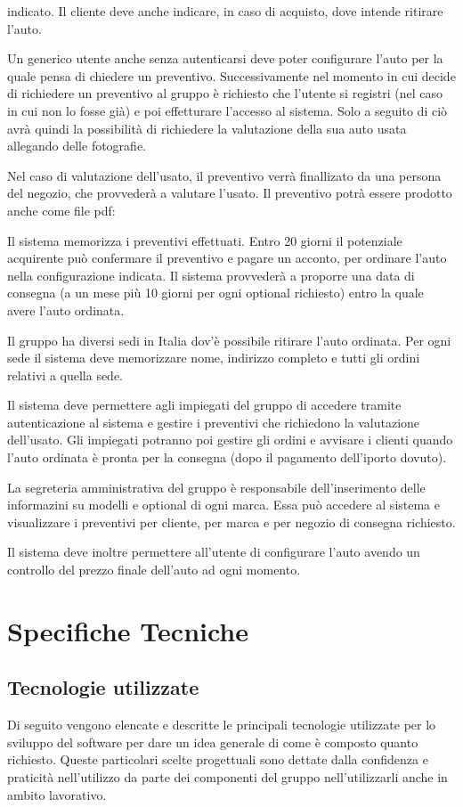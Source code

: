 \documentclass[a4paper, 11pt,oneside,]{book}
\newcommand{\spacing}{\par\bigskip\noindent}
\begin{document}
    indicato. Il cliente deve anche indicare, in caso di acquisto, dove intende ritirare l'auto.
    \spacing
    Un generico utente anche senza autenticarsi deve poter configurare l'auto per la quale pensa di chiedere un preventivo. Successivamente nel momento in cui decide di richiedere
    un preventivo al gruppo è richiesto che l'utente si registri (nel caso in cui non lo fosse già) e poi effetturare l'accesso al sistema. Solo a seguito di ciò avrà quindi la
    possibilità di richiedere la valutazione della sua auto usata allegando delle fotografie.
    \spacing
    Nel caso di valutazione dell'usato, il preventivo verrà finallizato da una persona del negozio, che provvederà a valutare l'usato. Il preventivo potrà essere prodotto anche come file pdf:
    \spacing
    Il sistema memorizza i preventivi effettuati. Entro 20 giorni il potenziale acquirente può confermare il preventivo e pagare un acconto, per ordinare l'auto nella configurazione
    indicata. Il sistema provvederà a proporre una data di consegna (a un mese più 10 giorni per ogni optional richiesto) entro la quale avere l'auto ordinata.
    \spacing
    Il gruppo ha diversi sedi in Italia dov'è possibile ritirare l'auto ordinata. Per ogni sede il sistema deve memorizzare nome, indirizzo completo e tutti gli ordini relativi a quella sede.
    \spacing
    Il sistema deve permettere agli impiegati del gruppo di accedere tramite autenticazione al sistema e gestire i preventivi che richiedono la valutazione dell'usato. Gli impiegati potranno poi 
    gestire gli ordini e avvisare i clienti quando l'auto ordinata è pronta per la consegna (dopo il pagamento dell'iporto dovuto).
    \spacing
    La segreteria amministrativa del gruppo è responsabile dell'inserimento delle informazini su modelli e optional di ogni marca. Essa può accedere al sistema e visualizzare i preventivi per cliente, per marca
    e per negozio di consegna richiesto.
    \spacing
    Il sistema deve inoltre permettere all'utente di configurare l'auto avendo un controllo del prezzo finale dell'auto ad ogni momento.



\chapter{Specifiche Tecniche}
    \section{Tecnologie utilizzate}
        Di seguito vengono elencate e descritte le principali tecnologie utilizzate per lo sviluppo del software per dare un idea generale di come è composto quanto richiesto. Queste particolari scelte progettuali sono dettate dalla confidenza
        e praticità nell'utilizzo da parte dei componenti del gruppo nell'utilizzarli anche in ambito lavorativo.
\end{document}
